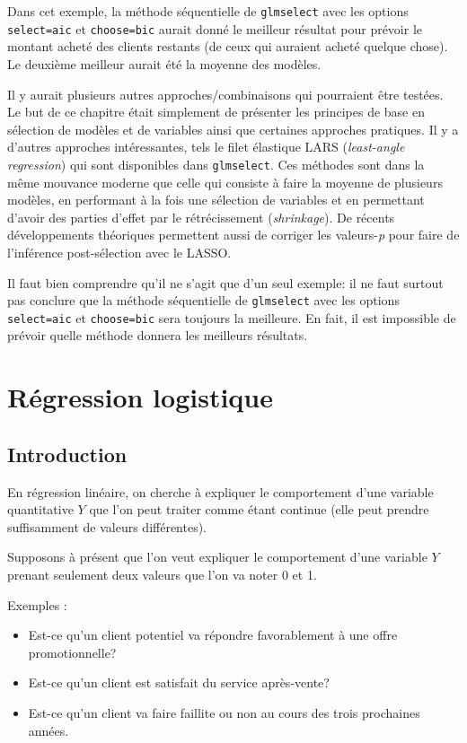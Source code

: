 \documentclass[
  11pt,
  letterpaper,
]{book}
\providecommand{\tightlist}{%
  \setlength{\itemsep}{0pt}\setlength{\parskip}{0pt}}
\theoremstyle{definition}
\theoremstyle{definition}
\theoremstyle{definition}
\theoremstyle{remark}
\begin{document}
Dans cet exemple, la méthode séquentielle de \texttt{glmselect} avec les options \texttt{select=aic} et \texttt{choose=bic} aurait donné le meilleur résultat pour prévoir le montant acheté des clients restants (de ceux qui auraient acheté quelque chose). Le deuxième meilleur aurait été la moyenne des modèles.

Il y aurait plusieurs autres approches/combinaisons qui pourraient être testées. Le but de ce chapitre était simplement de présenter les principes de base en sélection de modèles et de variables ainsi que certaines approches pratiques. Il y a d'autres approches intéressantes, tels le filet élastique LARS (\emph{least-angle regression}) qui sont disponibles dans \texttt{glmselect}. Ces méthodes sont dans la même mouvance moderne que celle qui consiste à faire la moyenne de plusieurs modèles, en performant à la fois une sélection de variables et en permettant d'avoir des parties d'effet par le rétrécissement (\emph{shrinkage}). De récents développements théoriques permettent aussi de corriger les valeurs-\emph{p} pour faire de l'inférence post-sélection avec le LASSO.

Il faut bien comprendre qu'il ne s'agit que d'un seul exemple: il ne faut surtout pas conclure que la méthode séquentielle de \texttt{glmselect} avec les options \texttt{select=aic} et \texttt{choose=bic} sera toujours la meilleure. En fait, il est impossible de prévoir quelle méthode donnera les meilleurs résultats.

\hypertarget{regression-logistique}{%
\chapter{Régression logistique}\label{regression-logistique}}

\hypertarget{introduction-4}{%
\section{Introduction}\label{introduction-4}}

En régression linéaire, on cherche à expliquer le comportement d'une variable quantitative \(Y\) que l'on peut traiter comme étant continue (elle peut prendre suffisamment de valeurs différentes).

Supposons à présent que l'on veut expliquer le comportement d'une variable \(Y\) prenant seulement deux valeurs que l'on va noter 0 et 1.

Exemples :

\begin{itemize}
\tightlist
\item
  Est-ce qu'un client potentiel va répondre favorablement à une offre promotionnelle?
\item
  Est-ce qu'un client est satisfait du service après-vente?
\item
  Est-ce qu'un client va faire faillite ou non au cours des trois prochaines années.
\end{itemize}
\end{document}
